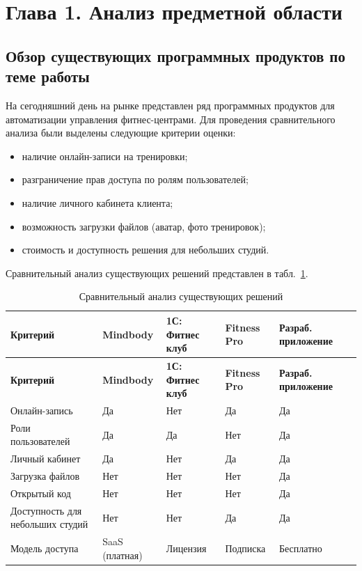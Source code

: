 \section*{Глава 1. Анализ предметной области}

\subsection{Обзор существующих программных продуктов по теме работы}

На сегодняшний день на рынке представлен ряд программных продуктов для
автоматизации управления фитнес-центрами. Для проведения сравнительного
анализа были выделены следующие критерии оценки:

\begin{itemize}
	\item наличие онлайн-записи на тренировки;
	\item разграничение прав доступа по ролям пользователей;
	\item наличие личного кабинета клиента;
	\item возможность загрузки файлов (аватар, фото тренировок);
	\item стоимость и доступность решения для небольших студий.
\end{itemize}

Сравнительный анализ существующих решений представлен в
табл.~\ref{tab:competitors}.

\begin{longtable}{|p{2.5cm}|p{2cm}|p{2cm}|p{2cm}|p{2cm}|p{2.5cm}|}
	\caption{Сравнительный анализ существующих решений}
	\label{tab:competitors} \\

	\hline
	\textbf{Критерий} & \textbf{Mindbody} & \textbf{1С: Фитнес клуб} & \textbf{Fitness Pro} & \textbf{Разраб. приложение} \\ \hline
	\endfirsthead

	\tabcont{\ref{tab:competitors}}
	\textbf{Критерий} & \textbf{Mindbody} & \textbf{1С: Фитнес клуб} & \textbf{Fitness Pro} & \textbf{Разраб. приложение} \\ \hline
	\endhead

	\hline
	\endfoot

	\hline
	\endlastfoot

	Онлайн-запись      & Да  & Нет & Да  & Да  \\ \hline
	Роли пользователей & Да  & Да  & Нет & Да  \\ \hline
	Личный кабинет     & Да  & Нет & Да  & Да  \\ \hline
	Загрузка файлов    & Нет & Нет & Нет & Да  \\ \hline
	Открытый код       & Нет & Нет & Нет & Да  \\ \hline
	Доступность для небольших студий & Нет & Нет & Да & Да \\ \hline
	Модель доступа     & SaaS (платная) & Лицензия & Подписка & Бесплатно \\ \hline
\end{longtable}

